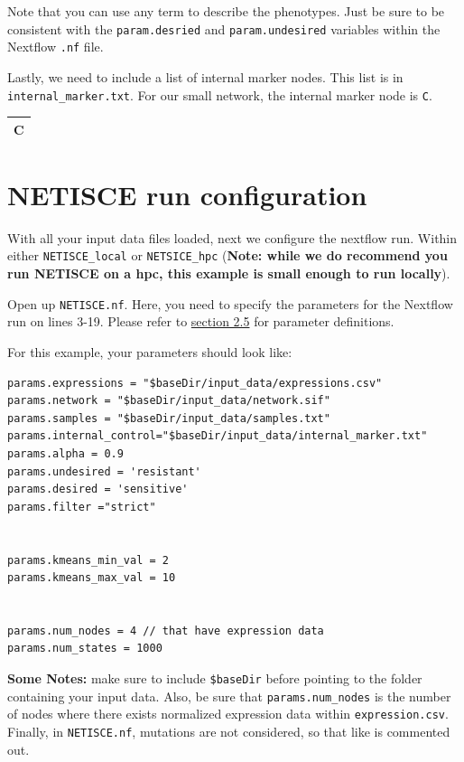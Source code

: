 \documentclass[
]{book}
\theoremstyle{definition}
\theoremstyle{definition}
\theoremstyle{definition}
\theoremstyle{definition}
\theoremstyle{remark}
\begin{document}
Note that you can use any term to describe the phenotypes. Just be sure to be consistent with the \texttt{param.desried} and \texttt{param.undesired} variables within the Nextflow \texttt{.nf} file.

Lastly, we need to include a list of internal marker nodes. This list is in \texttt{internal\_marker.txt}. For our small network, the internal marker node is \texttt{C}.

\begin{tabular}{l}
\hline
C\\


\hline
\end{tabular}

\hypertarget{netisce-run-configuration}{%
\section{NETISCE run configuration}\label{netisce-run-configuration}}

With all your input data files loaded, next we configure the nextflow run.
Within either \texttt{NETISCE\_local} or \texttt{NETSICE\_hpc} (\textbf{Note: while we do recommend you run NETISCE on a hpc, this example is small enough to run locally}).

Open up \texttt{NETISCE.nf}. Here, you need to specify the parameters for the Nextflow run on lines 3-19. Please refer to \protect\hyperlink{params}{section 2.5} for parameter definitions.

For this example, your parameters should look like:

\begin{verbatim}
params.expressions = "$baseDir/input_data/expressions.csv"
params.network = "$baseDir/input_data/network.sif"
params.samples = "$baseDir/input_data/samples.txt"
params.internal_control="$baseDir/input_data/internal_marker.txt"
params.alpha = 0.9
params.undesired = 'resistant'
params.desired = 'sensitive'
params.filter ="strict"


params.kmeans_min_val = 2
params.kmeans_max_val = 10


params.num_nodes = 4 // that have expression data
params.num_states = 1000
\end{verbatim}

\textbf{Some Notes: } make sure to include \texttt{\$baseDir} before pointing to the folder containing your input data. Also, be sure that \texttt{params.num\_nodes} is the number of nodes where there exists normalized expression data within \texttt{expression.csv}. Finally, in \texttt{NETISCE.nf}, mutations are not considered, so that like is commented out.
\end{document}
